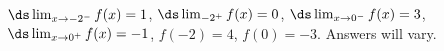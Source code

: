 {$\ds \lim_{x\to -2^-} f(x)=1$, \quad  $\ds \lim_{-2^+} f(x)=0$, \quad $\ds \lim_{x\to 0^-} f(x)=3$, \quad $\ds \lim_{x\to 0^+} f(x)=-1$, \quad $f(-2)=4$, \quad $f(0)=-3$.}
{Answers will vary.}
